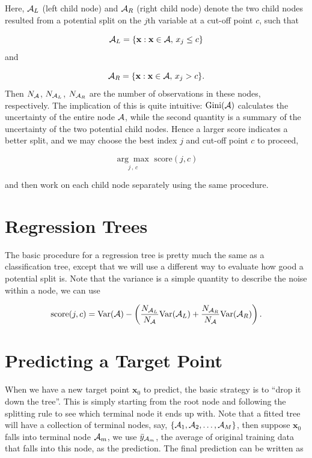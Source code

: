 \documentclass[
]{book}
\theoremstyle{definition}
\theoremstyle{definition}
\theoremstyle{definition}
\theoremstyle{definition}
\theoremstyle{remark}
\begin{document}
Here, \({\cal A}_L\) (left child node) and \({\cal A}_R\) (right child node) denote the two child nodes resulted from a potential split on the \(j\)th variable at a cut-off point \(c\), such that

\[{\cal A}_L = \{\mathbf{x}: \mathbf{x}\in {\cal A}, \, x_j \leq c\}\]
and

\[{\cal A}_R = \{\mathbf{x}: \mathbf{x}\in {\cal A}, \, x_j > c\}.\]
Then \(N_{\cal A}\), \(N_{{\cal A}_L}\), \(N_{{\cal A}_R}\) are the number of observations in these nodes, respectively. The implication of this is quite intuitive: \(\text{Gini}({\cal A})\) calculates the uncertainty of the entire node \({\cal A}\), while the second quantity is a summary of the uncertainty of the two potential child nodes. Hence a larger score indicates a better split, and we may choose the best index \(j\) and cut-off point \(c\) to proceed,

\[\underset{j \, , \, c}{\arg\max} \,\, \text{score}(j, c)\]

and then work on each child node separately using the same procedure.

\hypertarget{regression-trees}{%
\section{Regression Trees}\label{regression-trees}}

The basic procedure for a regression tree is pretty much the same as a classification tree, except that we will use a different way to evaluate how good a potential split is. Note that the variance is a simple quantity to describe the noise within a node, we can use

\begin{align}
\text{score}(j, c) = \text{Var}({\cal A}) - \left( \frac{N_{{\cal A}_L}}{N_{{\cal A}}} \text{Var}({\cal A}_L) + \frac{N_{{\cal A}_R}}{N_{{\cal A}}} \text{Var}({\cal A}_R)  \right).
\end{align}

\hypertarget{predicting-a-target-point}{%
\section{Predicting a Target Point}\label{predicting-a-target-point}}

When we have a new target point \(\mathbf{x}_0\) to predict, the basic strategy is to ``drop it down the tree''. This is simply starting from the root node and following the splitting rule to see which terminal node it ends up with. Note that a fitted tree will have a collection of terminal nodes, say, \(\{{\cal A}_1, {\cal A}_2, \ldots, {\cal A}_M\}\), then suppose \(\mathbf{x}_0\) falls into terminal node \({\cal A}_m\), we use \(\bar{y}_{{\cal A}_m}\), the average of original training data that falls into this node, as the prediction. The final prediction can be written as
\end{document}
